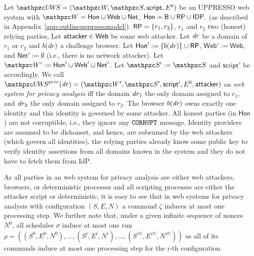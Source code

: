   \begin{definition}\label{def:uppresso-ws-priv}
    Let $\uppressowebsystem = (\bidsystem, \scriptset, 
    \mathsf{script}, E^0)$ be an UPPRESSO web system with 
    $\bidsystem = \mathsf{Hon} \cup \mathsf{Web} \cup \mathsf{Net}$, 
    $\mathsf{Hon} = \mathsf{B} \cup \mathsf{RP} \cup \mathsf{IDP}$.
    (as described in Appendix~\ref{app:outlineuppressomodel}).
    $\mathsf{RP} = \{r_1,r_2\}$, $r_1$ and $r_2$ two (honest) relying parties,
    Let $\mathsf{attacker} \in \mathsf{Web}$ be some web attacker.
    Let $\mathit{dr}$ be a domain of $r_1$ or $r_2$ and $b(\mathit{dr})$ a challenge browser. 
    Let $\mathsf{Hon}' := \{ b(\mathit{dr}) \} \cup \mathsf{RP}$, 
    $\mathsf{Web}' := \mathsf{Web}$, 
    and $\mathsf{Net}' := \emptyset$ (i.e., there is no network attacker).
    Let $\bidsystem' := \mathsf{Hon}' \cup \mathsf{Web}' \cup \mathsf{Net}'$.  
    Let $\scriptset' := \scriptset$ and $\mathsf{script}'$ be accordingly.
    We call $\uppressoprivwebsystem(\mi{dr}) = (\bidsystem', \scriptset', \mathsf{script}', E^0, \fAP{attacker})$ 
    an \emph{\uppresso web system for privacy analysis} 
    iff the domain $\mathit{dr}_1$ the only domain assigned to $r_1$, and
    $\mathit{dr}_2$ the only domain assigned to $r_2$. The browser
    $b(\mathit{dr})$ owns exactly one identity and this identity
    is governed by some attacker.  All honest parties (in
    $\mathsf{Hon}$) are not corruptible, i.e., they ignore any
    $\mathtt{CORRUPT}$ message. Identity providers are assumed to be
    dishonest, and hence, are subsumed by the web attackers (which
    govern all identities). %
    the relying
    parties already know some public key to verify \uppresso identity
    assertions from all domains known in the system and they do not have to fetch them from IdP.
  \end{definition}
  
  As all parties in an \uppresso web system for privacy analysis are either web 
  attackers, browsers, or deterministic processes and all scripting processes are 
  either the attacker script or deterministic, it is easy to see that in \uppresso 
  web systems for privacy analysis with configuration $(S,E,N)$ a command $\zeta$ 
  induces at most one processing step. We further note that, under a given infinite 
  sequence of nonces $N^0$, all schedules $\sigma$ induce at most one run 
  $\rho = ((S^0,E^0,N^0),\dots,(S^i,E^i,N^i),\dots,(S^{|\sigma|},E^{|\sigma|},N^{|\sigma|}))$ 
  as all of its commands induce at most one processing step for the $i$-th configuration.
  
